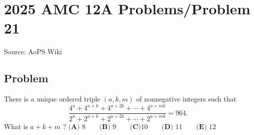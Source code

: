\documentclass[12pt]{article}
\begin{document}
\section*{{2025 AMC 12A Problems/Problem 21}}
Source: AoPS Wiki

\subsection*{Problem}
There is a unique ordered triple $(a,k,m)$ of nonnegative integers such that \[\frac{4^a + 4^{a+k}+4^{a+2k}+\cdots + 4^{a+mk}}{2^a + 2^{a+k} + 2^{a+2k}+ \cdots + 2^{a+mk}} = 964.\] What is $a+k+m$ ? $\textbf{(A) } 8 \qquad \textbf{(B) } 9 \qquad \textbf{(C)} 10 \qquad \textbf{(D) } 11 \qquad \textbf{(E) } 12$
\end{document}
